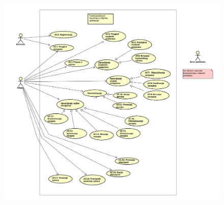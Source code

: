 		\begin{figure}[H]
			\includegraphics[scale=0.1]{dijagrami/Korisnik_klijent.png} 
			\centering
			\caption{}
			\label{fig:id6}
		\end{figure}